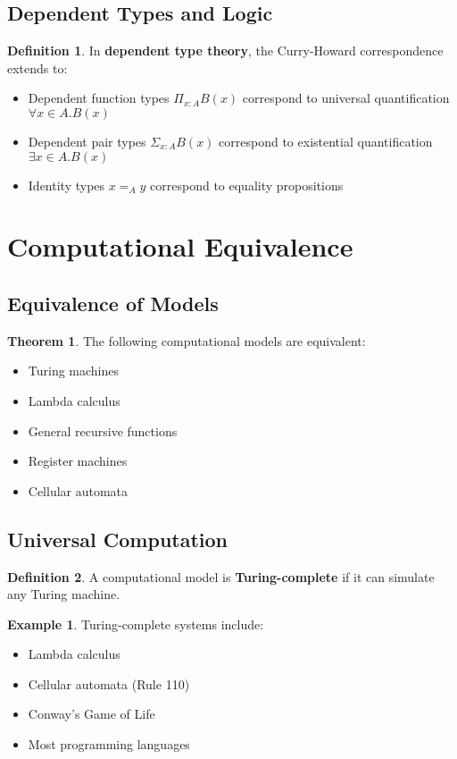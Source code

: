 \documentclass[11pt]{article}
\theoremstyle{definition}
\newtheorem{definition}{Definition}[section]
\newtheorem{theorem}{Theorem}[section]
\newtheorem{example}{Example}[section]
\begin{document}
\subsection{Dependent Types and Logic}
\begin{definition}
In \textbf{dependent type theory}, the Curry-Howard correspondence extends to:
\begin{itemize}
    \item Dependent function types $\Pi_{x:A} B(x)$ correspond to universal quantification $\forall x \in A. B(x)$
    \item Dependent pair types $\Sigma_{x:A} B(x)$ correspond to existential quantification $\exists x \in A. B(x)$
    \item Identity types $x =_A y$ correspond to equality propositions
\end{itemize}
\end{definition}

\section{Computational Equivalence}

\subsection{Equivalence of Models}
\begin{theorem}
The following computational models are equivalent:
\begin{itemize}
    \item Turing machines
    \item Lambda calculus
    \item General recursive functions
    \item Register machines
    \item Cellular automata
\end{itemize}
\end{theorem}

\subsection{Universal Computation}
\begin{definition}
A computational model is \textbf{Turing-complete} if it can simulate any Turing machine.
\end{definition}

\begin{example}
Turing-complete systems include:
\begin{itemize}
    \item Lambda calculus
    \item Cellular automata (Rule 110)
    \item Conway's Game of Life
    \item Most programming languages
\end{itemize}
\end{example}
\end{document}
